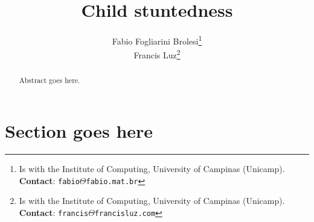 \documentclass[10pt,twocolumn,letterpaper]{article}
\begin{document}
\title{Child stuntedness}
\author{Fabio Fogliarini Brolesi\thanks{Is with the Institute of Computing, University of Campinas (Unicamp). \textbf{Contact}: \tt\small{fabio$\Theta$fabio.mat.br}}\\
Francis Luz\thanks{Is with the Institute of Computing, University of Campinas (Unicamp). \textbf{Contact}: \tt\small{francis$\Theta$francisluz.com}}
}

\maketitle
\begin{abstract}
Abstract goes here.
\end{abstract}

\section{Section goes here}

\nocite{*}
{\small


}
\end{document}
